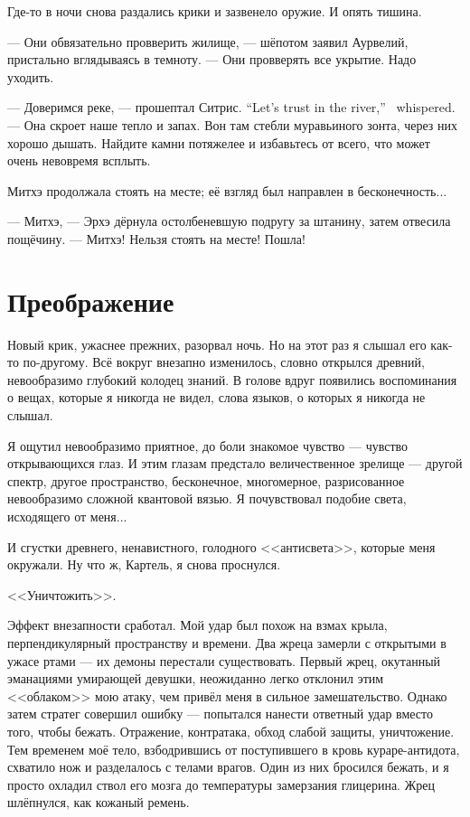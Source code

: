 Где-то в ночи снова раздались крики и зазвенело оружие.
И опять тишина.

--- Они обвязательно провверить жилище, --- шёпотом заявил Аурвелий, пристально вглядываясь в темноту.
--- Они провверять все укрытие.
Надо уходить.

{--- Доверимся реке, --- прошептал Ситрис.}
{``Let's trust in the river,'' \Sitris\ whispered.}
--- Она скроет наше тепло и запах.
Вон там стебли муравьиного зонта, через них хорошо дышать.
Найдите камни потяжелее и избавьтесь от всего, что может очень невовремя всплыть.

Митхэ продолжала стоять на месте;
её взгляд был направлен в бесконечность...

--- Митхэ, --- Эрхэ дёрнула остолбеневшую подругу за штанину, затем отвесила пощёчину.
--- Митхэ!
Нельзя стоять на месте!
Пошла!

\section{Преображение}

Новый крик, ужаснее прежних, разорвал ночь.
Но на этот раз я слышал его как-то по-другому.
Всё вокруг внезапно изменилось, словно открылся древний, невообразимо глубокий колодец знаний.
В голове вдруг появились воспоминания о вещах, которые я никогда не видел, слова языков, о которых я никогда не слышал.

Я ощутил невообразимо приятное, до боли знакомое чувство --- чувство открывающихся глаз.
И этим глазам предстало величественное зрелище --- другой спектр, другое пространство, бесконечное, многомерное, разрисованное невообразимо сложной квантовой вязью.
Я почувствовал подобие света, исходящего от меня...

И сгустки древнего, ненавистного, голодного <<антисвета>>, которые меня окружали.
Ну что ж, Картель, я снова проснулся.

<<Уничтожить>>.

Эффект внезапности сработал.
Мой удар был похож на взмах крыла, перпендикулярный пространству и времени.
Два жреца замерли с открытыми в ужасе ртами --- их демоны перестали существовать.
Первый жрец, окутанный эманациями умирающей девушки, неожиданно легко отклонил этим <<облаком>> мою атаку, чем привёл меня в сильное замешательство.
Однако затем стратег совершил ошибку --- попытался нанести ответный удар вместо того, чтобы бежать.
Отражение, контратака, обход слабой защиты, уничтожение.
Тем временем моё тело, взбодрившись от поступившего в кровь кураре-антидота, схватило нож и разделалось с телами врагов.
Один из них бросился бежать, и я просто охладил ствол его мозга до температуры замерзания глицерина.
Жрец шлёпнулся, как кожаный ремень.


